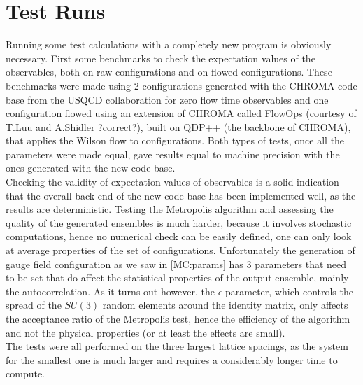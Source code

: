 \section{Test Runs}
\label{sec:testautocorr}
Running some test calculations with a completely new program is obviously necessary. First some benchmarks to check the expectation values of the observables, both on raw configurations and on flowed configurations. These benchmarks were made using 2 configurations generated with the CHROMA \cite{edwards_chroma_2005} code base from the USQCD collaboration for zero flow time observables and one configuration flowed using an extension of CHROMA called FlowOps (courtesy of T.Luu and A.Shidler ?correct?), built on QDP++ (the backbone of CHROMA), that applies the Wilson flow to configurations. Both types of tests, once all the parameters were made equal, gave results equal to machine precision with the ones generated with the new code base.\\
Checking the validity of expectation values of observables is a solid indication that the overall back-end of the new code-base has been implemented well, as the results are deterministic. Testing the Metropolis algorithm and assessing the quality of the generated ensembles is much harder, because it involves stochastic computations, hence no numerical check can be easily defined, one can only look at average properties of the set of configurations. Unfortunately the generation of gauge field configuration as we saw in \cref{MC:params} has 3 parameters that need to be set that do affect the statistical properties of the output ensemble, mainly the autocorrelation. As it turns out however, the $\epsilon$ parameter, which controls the spread of the $SU(3)$ random elements around the identity matrix, only affects the acceptance ratio of the Metropolis test, hence the efficiency of the algorithm and not the physical properties (or at least the effects are small).\\
The tests were all performed on the three largest lattice spacings, as the system for the smallest one is much larger and requires a considerably longer time to compute.

